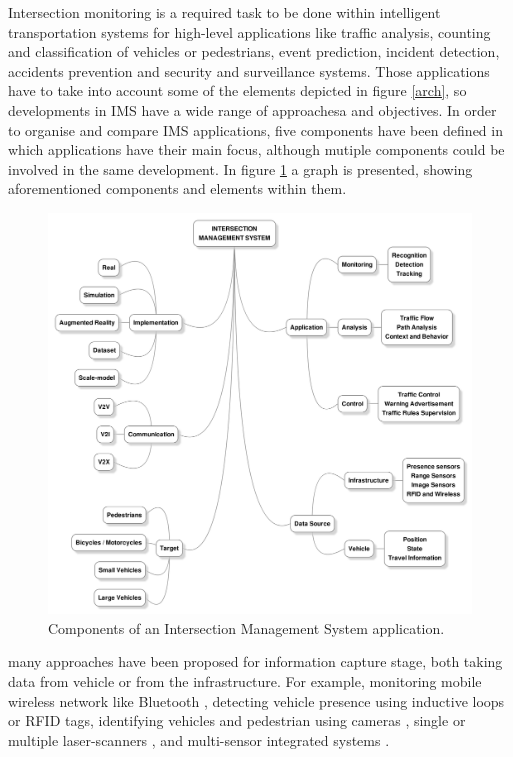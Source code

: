 Intersection monitoring is a required task to be done within intelligent transportation systems for high-level applications like traffic analysis, counting and classification of vehicles or pedestrians, event prediction, incident detection, accidents prevention and security and surveillance systems. Those applications have to take into account some of the elements depicted in figure \ref{arch}, so developments in IMS have a wide range of approachesa and objectives. In order to organise and compare IMS applications, five components have been defined in which applications have their main focus, although mutiple components could be involved in the same development. In figure  \ref{imsComps} a graph is presented, showing aforementioned components and elements within them.

\begin{figure}[ht!]
\centering
\includegraphics[scale=0.2125]{fig/2/ims_graph2.png}
\caption{Components of an Intersection Management System application.}
\label{imsComps}
\end{figure}

many approaches have been proposed for information capture stage, both taking data from vehicle or from the infrastructure. For example, monitoring mobile wireless network like Bluetooth \cite{Friesen2013}, detecting vehicle presence using inductive loops or RFID tags, identifying vehicles and pedestrian using cameras \cite{Buch2011, Strigel2013}, single or multiple laser-scanners \cite{Meissner2010, Meissner2012, Zhao2006, Zhao2008, Zhao2012}, and multi-sensor integrated systems \cite{Meissner2013, Meissner2013a, Meissner2014, GoldHammer2012, Zhao2009}.


